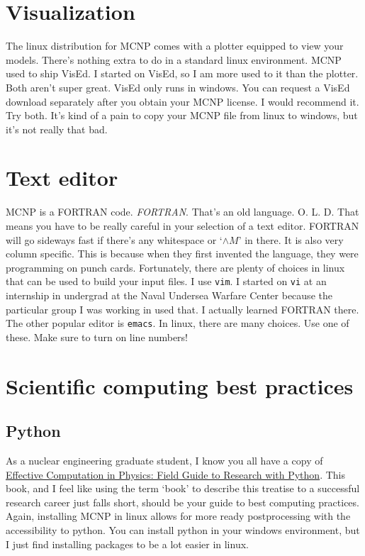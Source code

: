 \documentclass[11pt,a4paper]{article}
\begin{document}
\section{Visualization}
\noindent The linux distribution for MCNP comes with a plotter equipped to view your models. There's nothing extra to do in a standard linux environment. MCNP used to ship VisEd. I started on VisEd, so I am more used to it than the plotter. Both aren't super great. VisEd only runs in windows. You can request a VisEd download separately after you obtain your MCNP license. I would recommend it. Try both. It's kind of a pain to copy your MCNP file from linux to windows, but it's not really that bad.

\section{Text editor}
\noindent MCNP is a FORTRAN code. \textit{FORTRAN}. That's an old language. O. L. D. That means you have to be really careful in your selection of a text editor. FORTRAN will go sideways fast if there's any whitespace or `$\wedge M$' in there. It is also very column specific. This is because when they first invented the language, they were programming on punch cards. Fortunately, there are plenty of choices in linux that can be used to build your input files. I use \texttt{vim}. I started on \texttt{vi}
at an internship in undergrad at the Naval Undersea Warfare Center because the particular group I was working in used that. I actually learned FORTRAN there. The other popular editor is \texttt{emacs}. In linux, there are many choices. Use one of these. Make sure to turn on line numbers!

\section{Scientific computing best practices}
\subsection{Python}
\noindent As a nuclear engineering graduate student, I know you all have a copy of \href{https://www.google.com/books/edition/Effective_Computation_in_Physics/6IkNCgAAQBAJ?hl=en&gbpv=0}{Effective Computation in Physics: Field Guide to Research with Python}. This book, and I feel like using the term `book' to describe this treatise to a successful research career just falls short, should be your guide to best computing practices. Again, installing MCNP in linux allows for more ready
postprocessing with the accessibility to python. You can install python in your windows environment, but I just find installing packages to be a lot easier in linux. 
\end{document}
